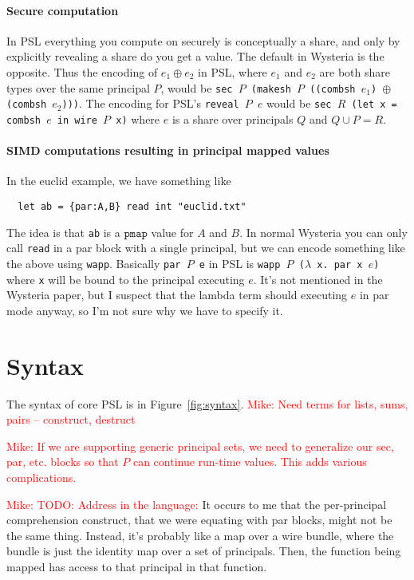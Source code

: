 \documentclass[10pt]{article}
\newcommand{\isec}{\ensuremath{\mathtt{pmap}}}
\newcommand{\mwh}[1]{\textcolor{red}{Mike: #1}}
\begin{document}
\paragraph{Secure computation} In PSL everything you compute on
securely is conceptually a share, and only by explicitly revealing a
share do you get a value. The default in Wysteria is the
opposite. Thus the encoding of $e_1 \oplus e_2$ in PSL, where $e_1$
and $e_2$ are both share types over the same principal $P$, would be
\texttt{sec $P$ (makesh $P$ ((combsh $e_1$) $\oplus$ (combsh
  $e_2$)))}. The encoding for PSL's \texttt{reveal $P$ $e$} would be
\texttt{sec $R$ (let x = combsh $e$ in wire $P$ x)} where $e$ is
a share over principals $Q$ and $Q \cup P = R$. 

\paragraph{SIMD computations resulting in principal mapped values} In
the euclid example, we have something like
\begin{verbatim}
  let ab = {par:A,B} read int "euclid.txt"
\end{verbatim}
The idea is that \verb+ab+ is a $\isec$ value for $A$ and $B$. In
normal Wysteria you can only call \texttt{read} in a par block with a
single principal, but we can encode something like the above using
\texttt{wapp}. Basically \texttt{par $P$ e} in PSL is \texttt{wapp $P$
  ($\lambda$ x. par x $e$)} where \texttt{x} will be bound to the principal
executing $e$. It's not mentioned in the Wysteria paper, but I suspect
that the lambda term should executing $e$ in par mode anyway, so I'm
not sure why we have to specify it.

\section{Syntax}

The syntax of core PSL is in Figure~\ref{fig:syntax}. \mwh{Need terms for
lists, sums, pairs -- construct, destruct}

\mwh{If we are supporting generic principal sets, we need to generalize our
sec, par, etc. blocks so that $P$ can continue run-time values. This
adds various complications.}

\mwh{TODO: Address in the language:} It occurs to me that the
per-principal comprehension construct, that we were equating with par
blocks, might not be the same thing. Instead, it's probably like a map
over a wire bundle, where the bundle is just the identity map over a
set of principals. Then, the function being mapped has access to that
principal in that function.
\end{document}
